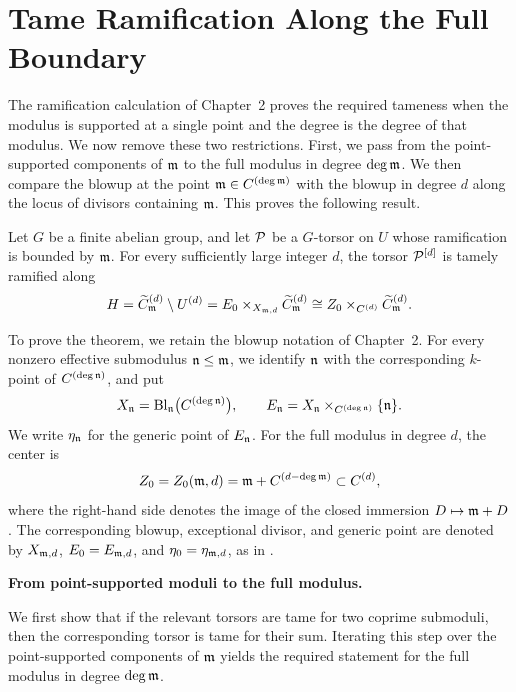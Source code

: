 \section{Tame Ramification Along the Full Boundary}\label{section:tame-ramification-full-boundary}

The ramification calculation of Chapter~2 proves the required tameness when
the modulus is supported at a single point and the degree is the degree of
that modulus. We now remove these two restrictions. First, we pass from the
point-supported components of $\mathfrak{m}$ to the full modulus in degree
$\deg\mathfrak{m}$. We then compare the blowup at the point
$\mathfrak{m}\in C^{(\deg\mathfrak{m})}$ with the blowup in degree $d$ along the locus of
divisors containing $\mathfrak{m}$. This proves the following result.

\begin{theorem}\label{theorem:SymmetricPowerOfSheafIsTamelyRamified}
Let $G$ be a finite abelian group, and let $\mathcal{P}$ be a $G$-torsor on $U$
whose ramification is bounded by $\mathfrak{m}$. For every sufficiently large
integer $d$, the torsor $\mathcal{P}^{[d]}$ is tamely ramified along
\[
H=\widetilde{C}_{\mathfrak{m}}^{(d)}\setminus U^{(d)}
  =E_0\times_{X_{\mathfrak{m},d}}\widetilde{C}_{\mathfrak{m}}^{(d)}
  \cong Z_0\times_{C^{(d)}}\widetilde{C}_{\mathfrak{m}}^{(d)}.
\]
\end{theorem}

To prove the theorem, we retain the blowup notation of Chapter~2. For every
nonzero effective submodulus $\mathfrak{n}\leq\mathfrak{m}$, we identify $\mathfrak{n}$ with the
corresponding $k$-point of $C^{(\deg\mathfrak{n})}$, and put
\[
    X_{\mathfrak{n}}=\operatorname{Bl}_{\mathfrak{n}}\bigl(C^{(\deg\mathfrak{n})}\bigr),
    \qquad
    E_{\mathfrak{n}}=X_{\mathfrak{n}}\times_{C^{(\deg\mathfrak{n})}}\{\mathfrak{n}\}.
\]
We write $\eta_{\mathfrak{n}}$ for the generic point of $E_{\mathfrak{n}}$. For the full
modulus in degree $d$, the center is
\[
Z_0=Z_0(\mathfrak{m},d)=\mathfrak{m}+C^{(d-\deg\mathfrak{m})}\subset C^{(d)},
\]
where the right-hand side denotes the image of the closed immersion
$D\mapsto\mathfrak{m}+D$.
The corresponding blowup, exceptional divisor, and generic point are denoted
by $X_{\mathfrak{m},d}$, $E_0=E_{\mathfrak{m},d}$, and
$\eta_0=\eta_{\mathfrak{m},d}$, as in
.

\noindent\textbf{From point-supported moduli to the full modulus.}

We first show that if the relevant torsors are tame for two coprime
submoduli, then the corresponding torsor is tame for their sum. Iterating
this step over the point-supported components of $\mathfrak{m}$ yields the required
statement for the full modulus in degree $\deg\mathfrak{m}$.

